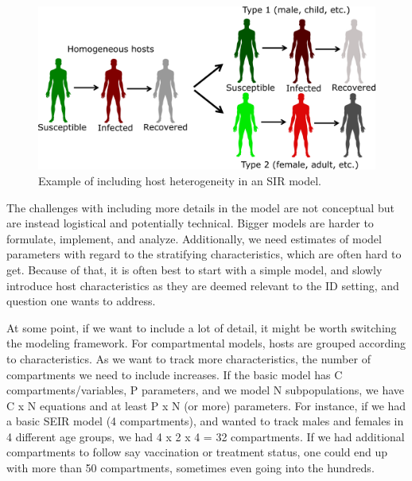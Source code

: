 \documentclass[]{article}
\theoremstyle{definition}
\theoremstyle{definition}
\theoremstyle{definition}
\theoremstyle{remark}
\begin{document}
\begin{figure}
\centering
\includegraphics{./images/heterogeneityexample.png}
\caption{\label{fig:heterogeneity}Example of including host heterogeneity in
an SIR model.}
\end{figure}

The challenges with including more details in the model are not
conceptual but are instead logistical and potentially technical. Bigger
models are harder to formulate, implement, and analyze. Additionally, we
need estimates of model parameters with regard to the stratifying
characteristics, which are often hard to get. Because of that, it is
often best to start with a simple model, and slowly introduce host
characteristics as they are deemed relevant to the ID setting, and
question one wants to address.

At some point, if we want to include a lot of detail, it might be worth
switching the modeling framework. For compartmental models, hosts are
grouped according to characteristics. As we want to track more
characteristics, the number of compartments we need to include
increases. If the basic model has C compartments/variables, P
parameters, and we model N subpopulations, we have C x N equations and
at least P x N (or more) parameters. For instance, if we had a basic
SEIR model (4 compartments), and wanted to track males and females in 4
different age groups, we had 4 x 2 x 4 = 32 compartments. If we had
additional compartments to follow say vaccination or treatment status,
one could end up with more than 50 compartments, sometimes even going
into the hundreds.
\end{document}
